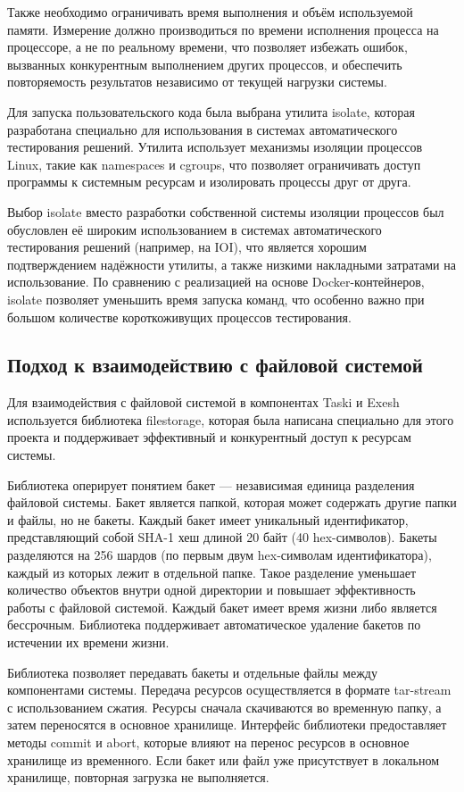 Также необходимо ограничивать время выполнения и объём используемой памяти.
Измерение должно производиться по времени исполнения процесса на процессоре, а не по реальному времени,
что позволяет избежать ошибок, вызванных конкурентным выполнением других процессов,
и обеспечить повторяемость результатов независимо от текущей нагрузки системы.

Для запуска пользовательского кода была выбрана утилита isolate,
которая разработана специально для использования в системах автоматического тестирования решений.
Утилита использует механизмы изоляции процессов Linux, такие как namespaces и cgroups,
что позволяет ограничивать доступ программы к системным ресурсам и изолировать процессы друг от друга.

Выбор isolate вместо разработки собственной системы изоляции процессов был обусловлен
её широким использованием в системах автоматического тестирования решений (например, на IOI),
что является хорошим подтверждением надёжности утилиты, а также низкими накладными затратами на использование.
По сравнению с реализацией на основе Docker-контейнеров, isolate позволяет уменьшить время запуска команд,
что особенно важно при большом количестве короткоживущих процессов тестирования.

\subsection{Подход к взаимодействию с файловой системой}

Для взаимодействия с файловой системой в компонентах Taski и Exesh используется библиотека filestorage,
которая была написана специально для этого проекта и поддерживает эффективный и конкурентный доступ к ресурсам системы.

Библиотека оперирует понятием бакет --- независимая единица разделения файловой системы.
Бакет является папкой, которая может содержать другие папки и файлы, но не бакеты.
Каждый бакет имеет уникальный идентификатор, представляющий собой SHA-1 хеш длиной 20 байт (40 hex-символов).
Бакеты разделяются на 256 шардов (по первым двум hex-символам идентификатора), каждый из которых лежит в отдельной папке.
Такое разделение уменьшает количество объектов внутри одной директории и повышает эффективность работы с файловой системой.
Каждый бакет имеет время жизни либо является бессрочным.
Библиотека поддерживает автоматическое удаление бакетов по истечении их времени жизни.

Библиотека позволяет передавать бакеты и отдельные файлы между компонентами системы.
Передача ресурсов осуществляется в формате tar-stream с использованием сжатия.
Ресурсы сначала скачиваются во временную папку, а затем переносятся в основное хранилище.
Интерфейс библиотеки предоставляет методы commit и abort, которые влияют на перенос ресурсов в основное хранилище из временного.
Если бакет или файл уже присутствует в локальном хранилище, повторная загрузка не выполняется.

